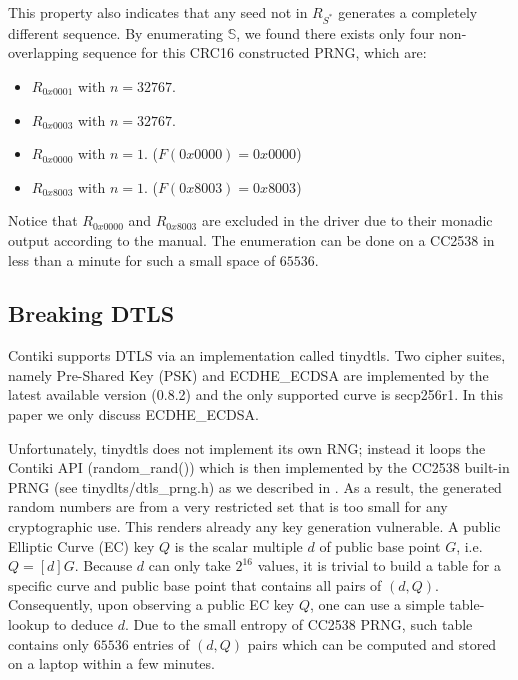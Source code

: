 This property also indicates that any seed not in $R_{S^*}$ generates a completely different sequence. By enumerating $\mathbb{S}$, we found there exists only four non-overlapping sequence for this CRC16 constructed PRNG, which are:
\begin{itemize}
	\item $R_{0x0001}$ with $n = 32767$.
	\item $R_{0x0003}$ with $n = 32767$.
	\item $R_{0x0000}$ with $n = 1$. ($F(0x0000) = 0x0000$)
	\item $R_{0x8003}$ with $n = 1$. ($F(0x8003) = 0x8003$)
\end{itemize}
Notice that $R_{0x0000}$ and $R_{0x8003}$ are excluded in the driver due to their monadic output according to the manual\cite{CC2538Manual}. The enumeration can be done on a CC2538 in less than a minute for such a small space of $65536$.

\subsection{Breaking DTLS} \label{BreakDTLS}
Contiki supports DTLS via an implementation called tinydtls\cite{tinydtls082}.  Two cipher suites, namely Pre-Shared Key\cite{rfc4279} (PSK) and ECDHE\_ECDSA\cite{rfc4492} are implemented by the latest available version (0.8.2) and the only supported curve is secp256r1\cite{secp256r1}. In this paper we only discuss ECDHE\_ECDSA. 


Unfortunately, tinydtls does not implement its own RNG; instead it loops the Contiki  API (random\_rand()) which is then implemented by the CC2538 built-in PRNG (see tinydlts/dtls\_prng.h) as we described in . As a result, the generated random numbers are from a very restricted set that is too small for any cryptographic use. This renders already any key generation vulnerable. A public Elliptic Curve (EC) key $Q$ is the scalar multiple $d$ of public base point $G$, i.e. $Q=[d]G$. Because $d$ can only take $2^{16}$ values, it is trivial to build a table for a specific curve and public base point that contains all pairs of $(d,Q)$. Consequently, upon observing a public EC key $Q$, one can use a simple table-lookup to deduce $d$. Due to the small entropy of CC2538 PRNG, such table contains only  $65536$ entries of $(d,Q)$ pairs which can be computed and stored on a laptop within a few minutes.


